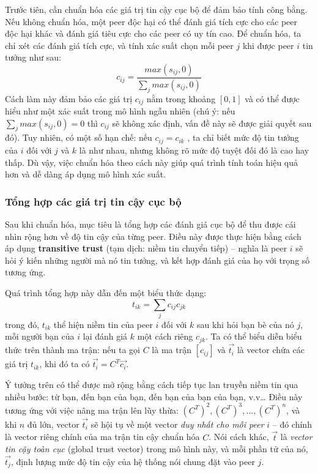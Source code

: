 Trước tiên, cần chuẩn hóa các giá trị tin cậy cục bộ để đảm bảo tính công bằng. Nếu không chuẩn hóa, một peer độc hại có thể đánh giá tích cực cho các peer độc hại khác và
đánh giá tiêu cực cho các peer có uy tín cao. Để chuẩn hóa, ta chỉ xét các đánh giá tích cực, và tính xác suất chọn mỗi peer $j$ khi được peer $i$ tin tưởng như sau:
\[c_{ij} = \frac{max(s_{ij}, 0)}{\sum_{j} max(s_{ij}, 0)}\]
Cách làm này đảm bảo các giá trị $c_{ij}$ nằm trong khoảng $[0, 1]$ và có thể được hiểu như một xác suất trong mô hình ngẫu nhiên
(chú ý: nếu $\sum_{j} max(s_{ij}, 0) = 0$ thì $c_{ij}$ sẽ không xác định, vấn đề này sẽ được giải quyết sau đó).
Tuy nhiên, có một số hạn chế: nếu $c_{ij} = c_{ik}$ , ta chỉ biết mức độ tin tưởng của $i$ đối với $j$ và $k$ là như nhau, nhưng không rõ mức độ tuyệt đối đó là cao hay thấp.
Dù vậy, việc chuẩn hóa theo cách này giúp quá trình tính toán hiệu quả hơn và dễ dàng áp dụng mô hình xác suất.

\subsubsection{Tổng hợp các giá trị tin cậy cục bộ}

Sau khi chuẩn hóa, mục tiêu là tổng hợp các đánh giá cục bộ để thu được cái nhìn rộng hơn về độ tin cậy của từng peer.
Điều này được thực hiện bằng cách áp dụng \textbf{transitive trust} (tạm dịch: niềm tin chuyển tiếp)
-- nghĩa là peer $i$ sẽ hỏi ý kiến những người mà nó tin tưởng, và kết hợp đánh giá của họ với trọng số tương ứng.

Quá trình tổng hợp này dẫn đến một biểu thức dạng:
\[t_{ik} = \sum_{j} c_{ij}c_{jk}\]
trong đó, $t_{ik}$ thể hiện niềm tin của peer $i$ đối với $k$ sau khi hỏi bạn bè của nó $j$, mỗi người bạn của $i$ lại đánh giá $k$ một cách riêng $c_{jk}$.
Ta có thể biểu diễn biểu thức trên thành ma trận: nếu ta gọi $C$ là ma trận $[c_{ij}]$ và $\vec{t_i}$ là vector chứa các giá trị $t_{ik}$, khi đó ta có
$\vec{t_i} = C^{T}\vec{c_i}$.

Ý tưởng trên có thể được mở rộng bằng cách tiếp tục lan truyền niềm tin qua nhiều bước: từ bạn, đến bạn của bạn, đến bạn của bạn của bạn, v.v\dots
Điều này tương ứng với việc nâng ma trận lên lũy thừa: $(C^T)^2, (C^T)^3, ..., (C^T)^n$, và khi $n$ đủ lớn, vector $\vec{t_i}$ sẽ hội tụ về một vector
\textit{duy nhất cho mỗi peer} $i$ -- đó chính là vector riêng chính của ma trận tin cậy chuẩn hóa $C$. Nói cách khác, $\vec{t}$ là \textit{vector tin cậy toàn cục} (global trust vector) trong mô hình này,
và mỗi phần tử của nó, $\vec{t_j}$, định lượng mức độ tin cậy của hệ thống nói chung đặt vào peer $j$.

